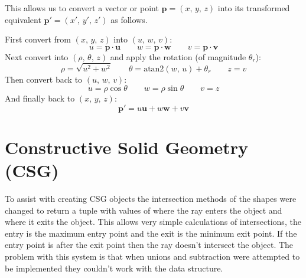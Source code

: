       This allows us to convert a vector or point $\mathbf{p} =
      \left(x,\,y,\,z\right)$ into its transformed equivalent $\mathbf{p}' =
      \left(x',\,y',\,z'\right)$ as follows.

      \noindent First convert from $\left(x,\,y,\,z\right)$ into $\left(u,\,w,\,v\right)$:
      \[ u = \mathbf{p} \cdot \mathbf{u} \qquad w = \mathbf{p} \cdot \mathbf{w}
         \qquad v = \mathbf{p} \cdot \mathbf{v} \]
      Next convert into $\left(\rho,\,\theta,\,z\right)$ and apply the rotation
      (of magnitude $\theta_r$):
      \[ \rho = \sqrt{u ^2 + w ^2} \qquad \theta =
      \textrm{atan2}\left(w,\,u\right) + \theta_r \qquad z = v \]
      Then convert back to $\left(u,\,w,\,v\right)$:
      \[ u = \rho\cos\theta \qquad w = \rho\sin\theta \qquad v = z \]
      And finally back to $\left(x,\,y,\,z\right)$:
      \[ \mathbf{p}' = u \mathbf{u} + w \mathbf{w} + v \mathbf{v} \]

  \section{Constructive Solid Geometry (CSG)}
    To assist with creating CSG objects the intersection methods of the
    shapes were changed to return a tuple with values of where the ray enters
    the object and where it exits the object.  This allows very simple
    calculations of intersections, the entry is the maximum entry point and
    the exit is the minimum exit point.  If the entry point is after the exit
    point then the ray doesn't intersect the object.  The problem with this
    system is that when unions and subtraction were attempted to be
    implemented they couldn't work with the data structure.


